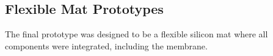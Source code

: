 \subsection{Flexible Mat Prototypes}
The final prototype was designed to be a flexible silicon mat where all components were integrated, including the membrane.

